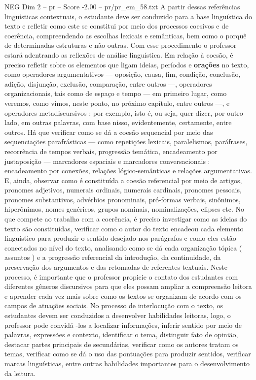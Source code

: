 \begin{textsample}{NEG Dim 2 – pr – Score -2.00 – pr/pr\_em\_58.txt}
A partir dessas referências linguísticas contextuais, o estudante deve ser conduzido para a base linguística do texto e refletir como este se constitui por meio dos processos coesivos e de coerência, compreendendo as escolhas lexicais e semânticas, bem como o porquê de determinadas estruturas e não outras.
Com esse procedimento o professor estará adentrando as reflexões de análise linguística.
Em relação à coesão, é preciso refletir sobre os elementos que ligam ideias, períodos e \textbf{orações} no texto, como operadores argumentativos — oposição, causa, fim, condição, conclusão, adição, disjunção, exclusão, comparação, entre outros —, operadores organizacionais, tais como de espaço e tempo — em primeiro lugar, como veremos, como vimos, neste ponto, no próximo capítulo, entre outros —, e operadores metadiscursivos : por exemplo, isto é, ou seja, quer dizer, por outro lado, em outras palavras, com base nisso, evidentemente, certamente, entre outros.
Há que verificar como se dá a coesão sequencial por meio das sequenciações parafrásticas — como repetições lexicais, paralelismos, paráfrases, recorrência de tempos verbais, progressão temática, encadeamento por justaposição — marcadores espaciais e marcadores conversacionais : encadeamento por conexões, relações lógico-semânticas e relações argumentativas.
E, ainda, observar como é constituída a coesão referencial por meio de artigos, pronomes adjetivos, numerais ordinais, numerais cardinais, pronomes pessoais, pronomes substantivos, advérbios pronominais, pró-formas verbais, sinônimos, hiperônimos, nomes genéricos, grupos nominais, nominalizações, elipses etc.
No que compete ao trabalho com a coerência, é preciso investigar como as ideias do texto são constituídas, verificar como o autor do texto encadeou cada elemento linguístico para produzir o sentido desejado nos parágrafos e como eles estão conectados no nível do texto, analisando como se dá cada organização tópica ( assuntos ) e a progressão referencial da introdução, da continuidade, da preservação dos argumentos e das retomadas de referentes textuais.
Neste processo, é importante que o professor propicie o contato dos estudantes com diferentes gêneros discursivos para que eles possam ampliar a compreensão leitora e aprender cada vez mais sobre como os textos se organizam de acordo com os campos de atuações sociais.
No processo de interlocução com o texto, os estudantes devem ser conduzidos a desenvolver habilidades leitoras, logo, o professor pode convidá -los a localizar informações, inferir sentido por meio de palavras, expressões e contexto, identificar o tema, distinguir fato de opinião, destacar partes principais de secundárias, verificar como os autores tratam os temas, verificar como se dá o uso das pontuações para produzir sentidos, verificar marcas linguísticas, entre outras habilidades importantes para o desenvolvimento da leitura.

\end{textsample}
